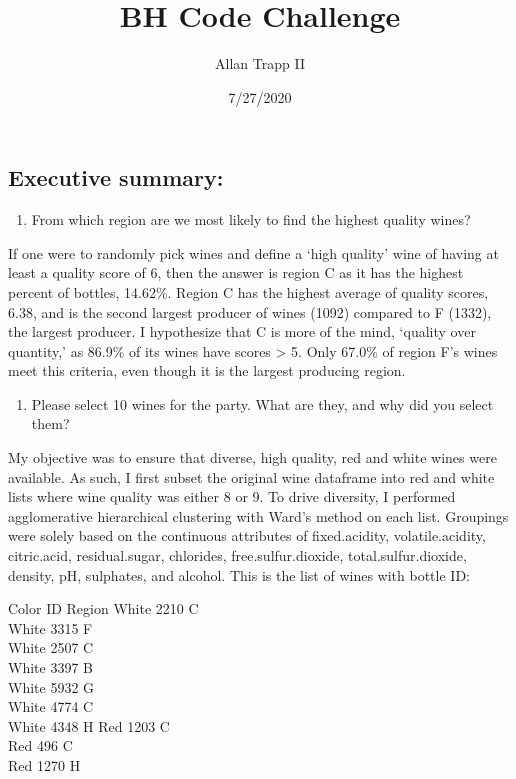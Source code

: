 \documentclass[
]{article}
\title{BH Code Challenge}
\author{Allan Trapp II}
\date{7/27/2020}
\providecommand{\tightlist}{%
  \setlength{\itemsep}{0pt}\setlength{\parskip}{0pt}}
\begin{document}
\maketitle

\hypertarget{executive-summary}{%
\subsection{Executive summary:}\label{executive-summary}}

\begin{enumerate}
\def\labelenumi{\arabic{enumi}.}
\tightlist
\item
  From which region are we most likely to find the highest quality
  wines?
\end{enumerate}

If one were to randomly pick wines and define a `high quality' wine of
having at least a quality score of 6, then the answer is region C as it
has the highest percent of bottles, 14.62\%. Region C has the highest
average of quality scores, 6.38, and is the second largest producer of
wines (1092) compared to F (1332), the largest producer. I hypothesize
that C is more of the mind, `quality over quantity,' as 86.9\% of its
wines have scores \textgreater{} 5. Only 67.0\% of region F's wines meet
this criteria, even though it is the largest producing region.

\begin{enumerate}
\def\labelenumi{\arabic{enumi}.}
\setcounter{enumi}{1}
\tightlist
\item
  Please select 10 wines for the party. What are they, and why did you
  select them?
\end{enumerate}

My objective was to ensure that diverse, high quality, red and white
wines were available. As such, I first subset the original wine
dataframe into red and white lists where wine quality was either 8 or 9.
To drive diversity, I performed agglomerative hierarchical clustering
with Ward's method on each list. Groupings were solely based on the
continuous attributes of fixed.acidity, volatile.acidity, citric.acid,
residual.sugar, chlorides, free.sulfur.dioxide, total.sulfur.dioxide,
density, pH, sulphates, and alcohol. This is the list of wines with
bottle ID:

Color ID Region White 2210 C\\
White 3315 F\\
White 2507 C\\
White 3397 B\\
White 5932 G\\
White 4774 C\\
White 4348 H Red 1203 C\\
Red 496 C\\
Red 1270 H
\end{document}
